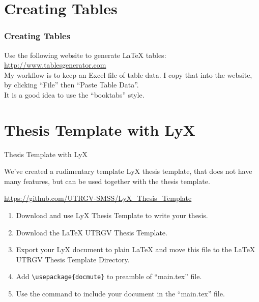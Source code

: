 \documentclass{beamer}
\begin{document}
\section{Creating Tables}
\begin{frame}
  \frametitle{Creating Tables}

  Use the following website to generate \LaTeX{} tables:
  \url{http://www.tablesgenerator.com}\\

  My workflow is to keep an Excel file of table data. I copy that into the
  website, by clicking ``File'' then ``Paste Table Data''.\\

  It is a good idea to use the ``booktabs'' style.


\end{frame}


\section{Thesis Template with LyX}
\begin{frame}[fragile]{Thesis Template with LyX}

  We've created a rudimentary template LyX thesis template,
  that does not have many features, but can be used together with the
  thesis template.

  \url{https://github.com/UTRGV-SMSS/LyX_Thesis_Template}\\

  \begin{enumerate}
      \item
        Download and use LyX Thesis Template to write your thesis.
      \item
        Download the \LaTeX{} UTRGV Thesis Template.
      \item
        Export your LyX document to plain \LaTeX{} and move this file
        to the \LaTeX{} UTRGV Thesis Template Directory.
      \item
        Add \verb|\usepackage{docmute}| to preamble of ``main.tex'' file.
      \item
        Use the \verb|| command to include your document in the
        ``main.tex'' file.

  \end{enumerate}
\end{frame}

\end{document}
